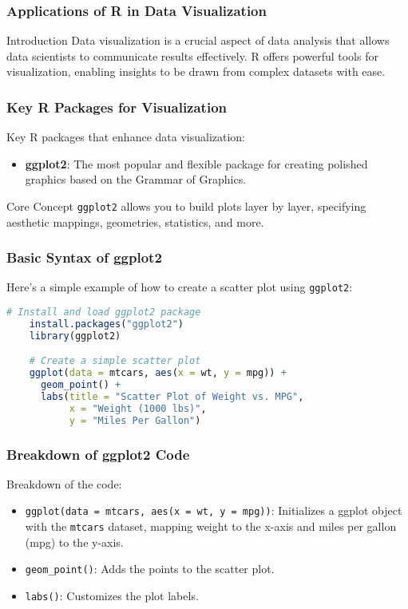 \documentclass[aspectratio=169]{beamer}
\begin{document}
\begin{frame}[fragile]
    \frametitle{Applications of R in Data Visualization}
    
    \begin{block}{Introduction}
        Data visualization is a crucial aspect of data analysis that allows data scientists to communicate results effectively. R offers powerful tools for visualization, enabling insights to be drawn from complex datasets with ease.
    \end{block}
\end{frame}

\begin{frame}[fragile]
    \frametitle{Key R Packages for Visualization}
    
    Key R packages that enhance data visualization:
    \begin{itemize}
        \item \textbf{ggplot2}: The most popular and flexible package for creating polished graphics based on the Grammar of Graphics.
    \end{itemize}
    
    \begin{block}{Core Concept}
        \texttt{ggplot2} allows you to build plots layer by layer, specifying aesthetic mappings, geometries, statistics, and more.
    \end{block}
\end{frame}

\begin{frame}[fragile]
    \frametitle{Basic Syntax of ggplot2}
    
    Here’s a simple example of how to create a scatter plot using \texttt{ggplot2}:
    \begin{lstlisting}[language=R]
    # Install and load ggplot2 package
    install.packages("ggplot2")
    library(ggplot2)

    # Create a simple scatter plot
    ggplot(data = mtcars, aes(x = wt, y = mpg)) +
      geom_point() +
      labs(title = "Scatter Plot of Weight vs. MPG",
           x = "Weight (1000 lbs)",
           y = "Miles Per Gallon")
    \end{lstlisting}
\end{frame}

\begin{frame}[fragile]
    \frametitle{Breakdown of ggplot2 Code}
    
    Breakdown of the code:
    \begin{itemize}
        \item \texttt{ggplot(data = mtcars, aes(x = wt, y = mpg))}: Initializes a ggplot object with the \texttt{mtcars} dataset, mapping weight to the x-axis and miles per gallon (mpg) to the y-axis.
        \item \texttt{geom_point()}: Adds the points to the scatter plot.
        \item \texttt{labs()}: Customizes the plot labels.
    \end{itemize}
\end{frame}
\end{document}
